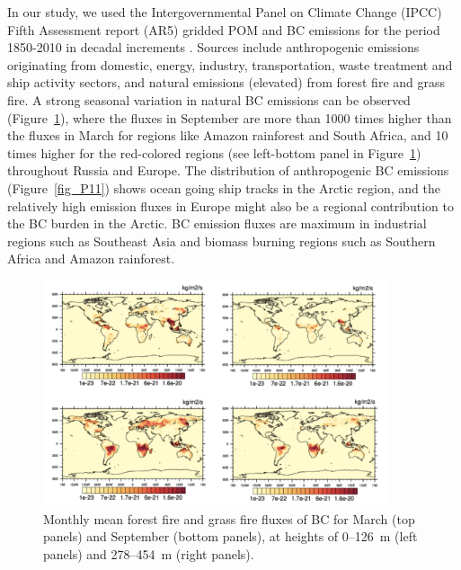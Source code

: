 \documentclass[12pt, fullpage]{uiucthesis2009}
\begin{document}
		In our study, we used the Intergovernmental Panel on Climate Change (IPCC) Fifth Assessment report (AR5) gridded POM and BC emissions for the period 1850-2010 in decadal increments \citep{Lamarque2010}. Sources include anthropogenic emissions originating from domestic, energy, industry, transportation, waste treatment and ship activity sectors, and natural emissions (elevated) from forest fire and grass fire. A strong seasonal variation in natural BC emissions can be observed (Figure~\ref{fig_P12}), where the fluxes in September are more than 1000 times higher than the fluxes in March for regions like Amazon rainforest and South Africa, and 10 times higher for the red-colored regions (see left-bottom panel in Figure~\ref{fig_P12}) throughout Russia and Europe. The distribution of anthropogenic BC emissions (Figure~\ref{fig_P11}) shows ocean going ship tracks in the Arctic region, and the relatively high emission fluxes in Europe might also be a regional contribution to the BC burden in the Arctic. BC emission fluxes are maximum in industrial regions such as Southeast Asia and biomass burning regions such as Southern Africa and Amazon rainforest. 
		
		\begin{figure}[h] 
			\begin{center}
				\includegraphics[width = 0.9\textwidth]{Figure12}
				\caption[Monthly mean forest fire and grass fire fluxes of BC for March (top panels) and September (bottom panels), at heights of 0--126~m (left panels) and 278--454~m (right panles)]{\label{fig_P12} Monthly mean forest fire and grass fire fluxes of BC for March (top panels) and September (bottom panels), at heights of 0--126~m (left panels) and 278--454~m (right panels).}
			\end{center}
		\end{figure}
		
\end{document}
